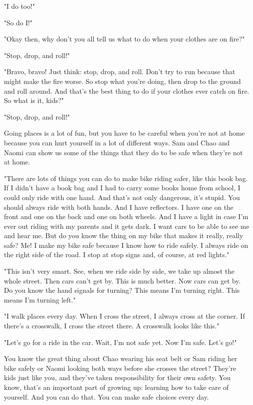"I do too!"

"So do I!"

"Okay then, why don't you all tell us what to do when your clothes are on fire?"

"Stop, drop, and roll!"

"Bravo, bravo! Just think: stop, drop, and roll. Don't try to run because that might make the fire worse. So stop what you're doing, then drop to the ground and roll around. And that's the best thing to do if your clothes ever catch on fire. So what is it, kids?"

"Stop, drop, and roll!"

Going places is a lot of fun, but you have to be careful when you're not at home because you can hurt yourself in a lot of different ways. Sam and Chao and Naomi can show us some of the things that they do to be safe when they're not at home.

"There are lots of things you can do to make bike riding safer, like this book bag. If I didn't have a book bag and I had to carry some books home from school, I could only ride with one hand. And that's not only dangerous, it's stupid. You should always ride with both hands. And I have reflectors. I have one on the front and one on the back and one on both wheels. And I have a light in case I'm ever out riding with my parents and it gets dark. I want cars to be able to see me and hear me. But do you know the thing on my bike that makes it really, really safe? Me! I make my bike safe because I know how to ride safely. I always ride on the right side of the road. I stop at stop signs and, of course, at red lights."

"This isn't very smart. See, when we ride side by side, we take up almost the whole street. Then cars can't get by. This is much better. Now cars can get by. Do you know the hand signals for turning? This means I'm turning right. This means I'm turning left."

"I walk places every day. When I cross the street, I always cross at the corner. If there's a crosswalk, I cross the street there. A crosswalk looks like this."

"Let's go for a ride in the car. Wait, I'm not safe yet. Now I'm safe. Let's go!"

You know the great thing about Chao wearing his seat belt or Sam riding her bike safely or Naomi looking both ways before she crosses the street? They're kids just like you, and they've taken responsibility for their own safety. You know, that's an important part of growing up: learning how to take care of yourself. And you can do that. You can make safe choices every day.

